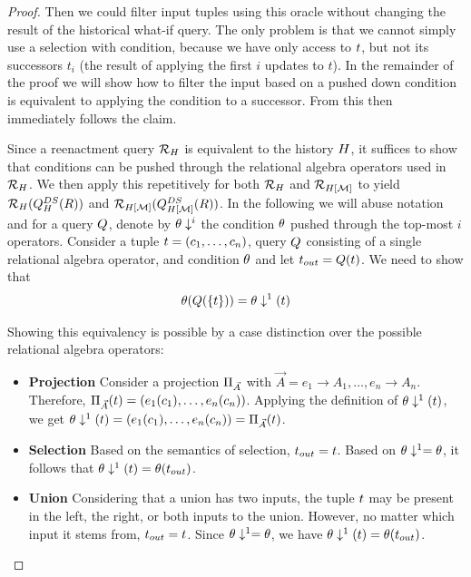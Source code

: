 \begin{proof}
Then we could filter input tuples using this oracle without changing the result of the historical what-if query. The only problem is that we cannot simply use a selection with condition, because we have only access to $t$, but not its successors $t_i$ (the result of applying the first $i$ updates to $t$). In the remainder of the proof we will show how to filter the input based on a pushed down condition is equivalent to applying the condition to a successor. From this then immediately follows the claim.

Since a reenactment query $\mathcal{R}_{H}$ is equivalent to the history $H$, it suffices to show that conditions can be pushed through the relational algebra operators used in $\mathcal{R}_{H}$. We then apply this repetitively for both $\mathcal{R}_{H}$ and $\mathcal{R}_{H[\mathcal{M}]}$ to yield $\mathcal{R}_{H}(Q_{H}^{DS}(R))$ and $\mathcal{R}_{H[\mathcal{M}]}(Q_{H[\mathcal{M}]}^{DS}(R))$.
In the following we will abuse notation and for a query $Q$, denote by ${\theta}\downarrow^{i}$ the condition $\theta$ pushed through the top-most $i$ operators.
Consider a tuple $t = (c_1, \ldots, c_n)$, query $Q$ consisting of a single relational algebra operator, and condition $\theta$ and let $t_{out} = Q(t)$.
We need to show that
\begin{align}
  \theta(Q(\{t\})) = {\theta}\downarrow^{1}(t)
  \label{eq:push-down-eq}
\end{align}


Showing this equivalency is possible by a case distinction over the possible relational algebra operators:
\begin{itemize}
	\item \textbf{Projection} Consider a projection $\Pi_{\vec{A}}$ with $\vec{A} = e_1 \to A_1, \ldots, e_n \to A_n$. Therefore, $\Pi_{\vec{A}}(t) = (e_1(c_1), \ldots, e_n(c_n))$. Applying the definition of ${\theta}\downarrow^{1}(t)$, we get ${\theta}\downarrow^{1}(t) = (e_1(c_1), \ldots, e_n(c_n)) = \Pi_{\vec{A}}(t)$.
	\item \textbf{Selection} Based on the semantics of selection, $t_{out} = t$. Based on ${\theta}\downarrow^{1} = \theta$, it follows that ${\theta}\downarrow^{1}(t) = \theta(t_{out})$.
	\item \textbf{Union} Considering that a union has two inputs, the tuple $t$ may be present in the left, the right, or both inputs to the union. However, no matter which input it stems from, $t_{out} = t$. Since ${\theta}\downarrow^{1} = \theta$, we have ${\theta}\downarrow^{1}(t) = \theta(t_{out})$.
\end{itemize}


\end{proof}
